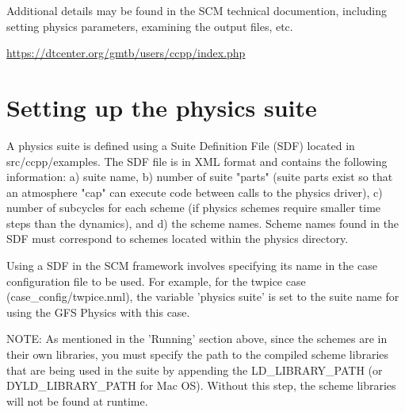 
Additional details may be found in the SCM technical documention, including setting physics parameters, examining the output files, etc.  

\url{https://dtcenter.org/gmtb/users/ccpp/index.php}


\section{Setting up the physics suite}
A physics suite is defined using a Suite Definition File (SDF) located in
src/ccpp/examples. The SDF file is in XML format and contains the following information: a) suite name, b) number of suite
"parts" (suite parts exist so that an atmosphere "cap" can execute code between
calls to the physics driver), c) number of subcycles for each scheme (if
physics schemes require smaller time steps than the dynamics), and d) the scheme
names. Scheme names found in the SDF must correspond to schemes
located within the physics directory.

Using a SDF in the SCM framework involves specifying its name in the case
configuration file to be used. For example, for the twpice case
(case\_config/twpice.nml), the variable 'physics suite' is set to the 
suite name for using the GFS Physics with this case. 

NOTE: As mentioned in the 'Running' section above, since the schemes
 are in their own libraries, you must specify the path to the compiled scheme
 libraries that are being used in the suite by appending the LD\_LIBRARY\_PATH
 (or DYLD\_LIBRARY\_PATH for Mac OS). Without this step, the scheme libraries will
  not be found at runtime.


